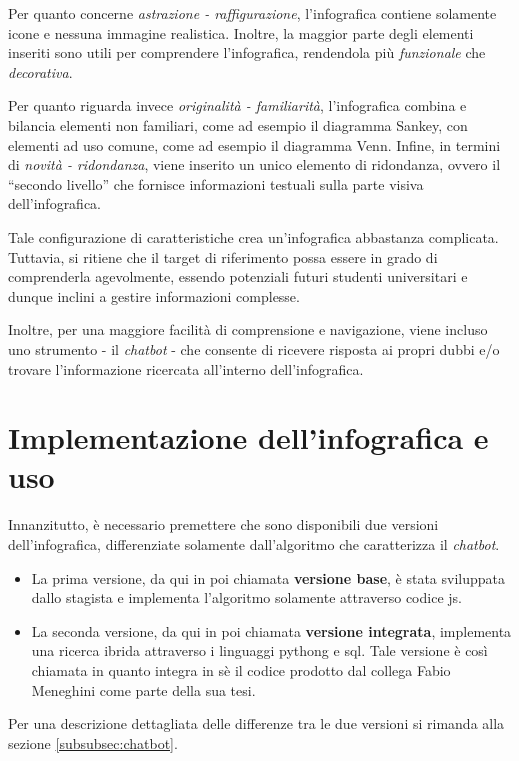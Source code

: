 Per quanto concerne \emph{astrazione - raffigurazione}, l'infografica contiene solamente icone e nessuna immagine realistica. Inoltre, la maggior parte degli elementi
inseriti sono utili per comprendere l'infografica, rendendola più \emph{funzionale} che \emph{decorativa}.

Per quanto riguarda invece \emph{originalità - familiarità}, l'infografica combina e bilancia elementi non familiari, come ad esempio il diagramma Sankey, con elementi
ad uso comune, come ad esempio il diagramma Venn. 
Infine, in termini di \emph{novità - ridondanza}, viene inserito un unico elemento di ridondanza, ovvero il ``secondo livello'' che fornisce informazioni testuali sulla parte visiva 
dell'infografica.

\bigskip
\noindent Tale configurazione di caratteristiche crea un'infografica abbastanza complicata. Tuttavia, si ritiene che il target di riferimento possa essere in grado di comprenderla agevolmente, essendo 
potenziali futuri studenti universitari e dunque inclini a gestire informazioni complesse. 

Inoltre, per una maggiore facilità di comprensione e navigazione, viene incluso uno strumento - il \emph{chatbot} - che consente di ricevere risposta ai propri dubbi e/o 
trovare l'informazione ricercata all'interno dell'infografica.

\section{Implementazione dell'infografica e uso}
Innanzitutto, è necessario premettere che sono disponibili due versioni dell'infografica, differenziate solamente dall'algoritmo che caratterizza il \emph{chatbot}.
\begin{itemize}
    \item La prima versione, da qui in poi chiamata \textbf{versione base}, è stata sviluppata dallo stagista e implementa l'algoritmo solamente attraverso codice \gls{js}. 
    \item La seconda versione, da qui in poi chiamata \textbf{versione integrata}, implementa una ricerca ibrida attraverso i linguaggi \gls{pythong} e \gls{sql}.
    Tale versione è così chiamata in quanto integra in sè il codice prodotto dal collega Fabio Meneghini come parte della sua tesi.    
\end{itemize}
Per una descrizione dettagliata delle differenze tra le due versioni si rimanda alla sezione \ref{subsubsec:chatbot}.

